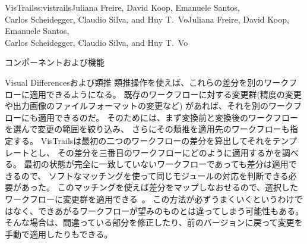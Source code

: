 \begin{aosachaptertoc}{VisTrails}{s:vistrails}{Juliana Freire, David Koop, Emanuele Santos, \\ Carlos Scheidegger, Claudio Silva, and Huy T.\ Vo}{Juliana Freire, David Koop, Emanuele Santos, \\ \hspace*{0.9cm} Carlos Scheidegger, Claudio Silva, and Huy T.\ Vo}
\begin{aosasect1}{コンポーネントおよび機能}
\begin{aosasect2}{Visual Differencesおよび類推}
類推操作を使えば、これらの差分を別のワークフローに適用できるようになる。
既存のワークフローに対する変更群(精度の変更や出力画像のファイルフォーマットの変更など)
があれば、それを別のワークフローにも適用できるのだ。
そのためには、まず変換前と変換後のワークフローを選んで変更の範囲を絞り込み、
さらにその類推を適用先のワークフローも指定する。
VisTrailsは最初の二つのワークフローの差分を算出してそれをテンプレートとし、
その差分を三番目のワークフローにどのように適用するかを調べる。
最初の状態が完全に一致していないワークフローであっても差分は適用できるので、
ソフトなマッチングを使って同じモジュールの対応を判断できる必要があった。
このマッチングを使えば差分をマップしなおせるので、選択したワークフローに変更群を適用できる~\cite{bib:scheidegger:analogy}。
この方法が必ずうまくいくというわけではなく、できあがるワークフローが望みのものとは違ってしまう可能性もある。
そんな場合は、間違っている部分を修正したり、前のバージョンに戻って変更を手動で適用したりもできる。


\end{aosasect2}
\end{aosasect1}
\end{aosachaptertoc}
